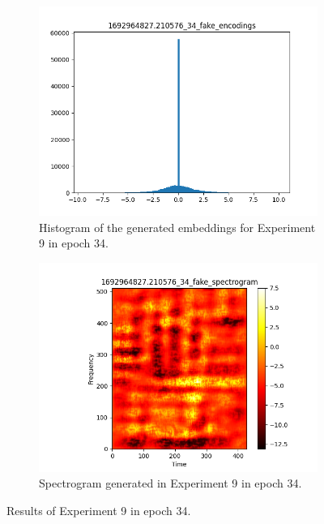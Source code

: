 \begin{figure}[!ht]
    \centering
    \begin{subfigure}{0.4\textwidth}
        \includegraphics[width=\textwidth]{figures/4.5-results/exp9_34_hist.png}
        \caption{Histogram of the generated embeddings for Experiment 9 in epoch 34.}
        \label{fig:exp9_34_hist}
    \end{subfigure}
    \begin{subfigure}{0.4\textwidth}
        \includegraphics[width=\textwidth]{figures/4.5-results/exp9_34_spectrogram.png}
        \caption{Spectrogram generated in Experiment 9 in epoch 34.}
        \label{fig:exp9_34_spectrogram}
    \end{subfigure}
    \caption{Results of Experiment 9 in epoch 34.}
    \label{fig:exp9_34_results}
\end{figure}

